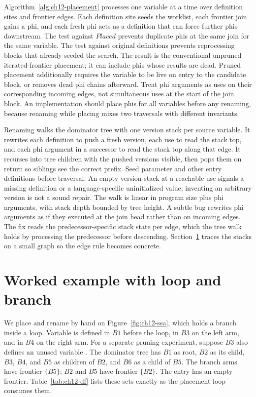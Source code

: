 Algorithm~\ref{alg:ch12-placement} processes one variable at a time over definition sites and frontier edges.
Each definition site seeds the worklist, each frontier join gains a phi, and each fresh phi acts as a definition that can force further phis downstream.
The test against $Placed$ prevents duplicate phis at the same join for the same variable.
The test against original definitions prevents reprocessing blocks that already seeded the search.
The result is the conventional unpruned iterated-frontier placement; it can include phis whose results are dead.
Pruned placement additionally requires the variable to be live on entry to the candidate block, or removes dead phi chains afterward.
Treat phi arguments as uses on their corresponding incoming edges, not simultaneous uses at the start of the join block.
An implementation should place phis for all variables before any renaming, because renaming while placing mixes two traversals with different invariants.

Renaming walks the dominator tree with one version stack per source variable.
It rewrites each definition to push a fresh version, each use to read the stack top, and each phi argument in a successor to read the stack top along that edge.
It recurses into tree children with the pushed versions visible, then pops them on return so siblings see the correct prefix.
Seed parameter and other entry definitions before traversal.
An empty version stack at a reachable use signals a missing definition or a language-specific uninitialized value; inventing an arbitrary version is not a sound repair.
The walk is linear in program size plus phi arguments, with stack depth bounded by tree height.
A subtle bug rewrites phi arguments as if they executed at the join head rather than on incoming edges.
The fix reads the predecessor-specific stack state per edge, which the tree walk holds by processing the predecessor before descending.
Section~\ref{sec:ch12-worked} traces the stacks on a small graph so the edge rule becomes concrete.
\section{Worked example with loop and branch}
\label{sec:ch12-worked}

We place and rename by hand on Figure~\ref{fig:ch12-ssa}, which holds a branch inside a loop.
Variable  is defined in $B1$ before the loop, in $B3$ on the left arm, and in $B4$ on the right arm.
For a separate pruning experiment, suppose $B3$ also defines an unused variable .
The dominator tree has $B1$ as root, $B2$ as its child, $B3$, $B4$, and $B5$ as children of $B2$, and $B6$ as a child of $B5$.
The branch arms have frontier $\{B5\}$; $B2$ and $B5$ have frontier $\{B2\}$.
The entry has an empty frontier.
Table~\ref{tab:ch12-df} lists these sets exactly as the placement loop consumes them.

